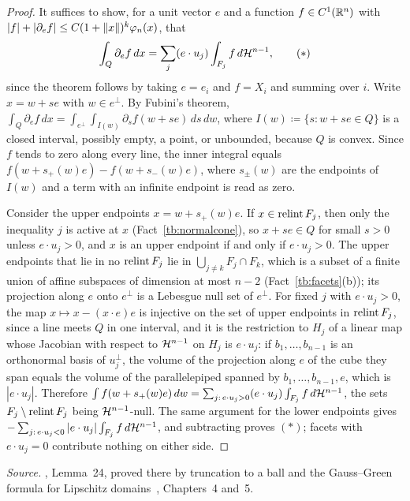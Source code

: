 \documentclass[11pt,letterpaper]{article}
\theoremstyle{plain}
\begin{document}
\begin{proof}
It suffices to show, for a unit vector \(e\) and a function
\(f\in C^1(\mathbb R^n)\) with \(|f|+|\partial_ef|\le C(1+\left\lVert x\right\rVert)^k\varphi_n(x)\),
that
\begin{equation}
 \int_Q\partial_ef\,dx=\sum_j(e\cdot u_j)\int_{F_j}f\,d\mathcal H^{n-1},
 \tag{\(*\)}
\end{equation}
since the theorem follows by taking \(e=e_i\) and \(f=X_i\) and summing over
\(i\). Write \(x=w+s e\) with \(w\in e^\perp\). By Fubini's theorem,
\(\int_Q\partial_ef\,dx=\int_{e^\perp}\int_{I(w)}\partial_sf(w+s e)\,ds\,dw\),
where \(I(w)\coloneqq \{s:w+s e\in Q\}\) is a closed interval, possibly empty, a point,
or unbounded, because \(Q\) is convex. Since \(f\) tends to zero along every
line, the inner integral equals \(f(w+s_+(w)e)-f(w+s_-(w)e)\), where
\(s_\pm(w)\) are the endpoints of \(I(w)\) and a term with an infinite
endpoint is read as zero.

Consider the upper endpoints \(x=w+s_+(w)e\). If \(x\in\operatorname{relint} F_j\), then
only the inequality \(j\) is active at \(x\) (Fact~\ref{tb:normalcone}), so
\(x+s e\in Q\) for small \(s>0\) unless \(e\cdot u_j>0\), and \(x\) is an upper
endpoint if and only if \(e\cdot u_j>0\). The upper endpoints that lie in no
\(\operatorname{relint} F_j\) lie in \(\bigcup_{j\ne k}F_j\cap F_k\), which is a subset of a
finite union of affine subspaces of dimension at most \(n-2\)
(Fact~\ref{tb:facets}(b)); its projection along \(e\) onto \(e^\perp\) is a
Lebesgue null set of \(e^\perp\). For fixed \(j\) with \(e\cdot u_j>0\), the
map \(x\mapsto x-(x\cdot e)e\) is injective on the set of upper endpoints in
\(\operatorname{relint} F_j\), since a line meets \(Q\) in one interval, and it is the
restriction to \(H_j\) of a linear map whose Jacobian with respect to
\(\mathcal H^{n-1}\) on \(H_j\) is \(e\cdot u_j\): if \(b_1,\ldots,b_{n-1}\) is an
orthonormal basis of \(u_j^\perp\), the volume of the projection along \(e\)
of the cube they span equals the volume of the parallelepiped spanned by
\(b_1,\ldots,b_{n-1},e\), which is \(|e\cdot u_j|\). Therefore
\(\int f(w+s_+(w)e)\,dw=\sum_{j:\,e\cdot u_j>0}(e\cdot u_j)\int_{F_j}f\,d\mathcal H^{n-1}\),
the sets \(F_j\setminus\operatorname{relint} F_j\) being \(\mathcal H^{n-1}\)-null. The same
argument for the lower endpoints gives
\(-\sum_{j:\,e\cdot u_j<0}|e\cdot u_j|\int_{F_j}f\,d\mathcal H^{n-1}\), and
subtracting proves \((*)\); facets with \(e\cdot u_j=0\) contribute nothing
on either side.
\end{proof}

\emph{Source.} , Lemma~24, proved there by truncation to a ball and
the Gauss--Green formula for Lipschitz domains~, Chapters~4
and~5.
\end{document}
